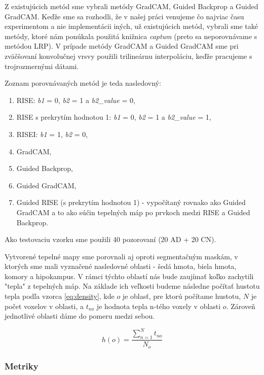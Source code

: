 Z existujúcich metód sme vybrali metódy GradCAM, Guided Backprop a Guided GradCAM. Keďže sme sa rozhodli, že v našej práci venujeme čo najviac času experimentom a nie implementácii iných, už existujúcich metód, vybrali sme také metódy, ktoré nám ponúkala použitá knižnica \textit{captum} (preto sa neporovnávame s metódou LRP). V prípade metódy GradCAM a Guided GradCAM sme pri zväčšovaní konvolučnej vrsvy použili trilineárnu interpoláciu, keďže pracujeme s trojrozmernými dátami.

Zoznam porovnávaných metód je teda nasledovný:

\begin{enumerate}[label=\Alph*]
    \item RISE: \textit{b1} = 0, \textit{b2} = 1 a \textit{b2\_value} = 0,
    \item RISE s prekrytím hodnotou 1: \textit{b1} = 0, \textit{b2} = 1 a \textit{b2\_value} = 1,
    \item RISEI: \textit{b1} = 1, \textit{b2} = 0,
    \item GradCAM,
    \item Guided Backprop,
    \item Guided GradCAM,
    \item Guided RISE (s prekrytím hodnotou 1) - vypočítaný rovnako ako Guided GradCAM a to ako súčin tepelných máp po prvkoch medzi RISE a Guided Backprop.
\end{enumerate}

Ako testovaciu vzorku sme použili 40 pozorovaní (20 AD + 20 CN).

Vytvorené tepelné mapy sme porovnali aj oproti segmentačným maskám, v ktorých sme mali vyznačené nasledovné oblasti - šedá hmota, biela hmota, komory a hipokampus. V rámci týchto oblastí nás bude zaujímať koľko zachytili "tepla" z tepelných máp. Na základe ich veľkosti budeme následne počítať hustotu tepla podľa vzorca \eqref{eq:density}, kde $o$ je oblasť, pre ktorú počítame hustotu, $N$ je počet voxelov v oblasti, a $t_{no}$ je hodnota tepla n-tého voxely v oblasti $o$. Zároveň jednotlivé oblasti dáme do pomeru medzi sebou.

\begin{equation}
    h(o) = \frac{\sum_{n=1}^{N}{t_{no}}}{N_o}
    \label{eq:density}
\end{equation}

\subsubsection{Metriky \label{sec:verification_experiments_metrics}}

